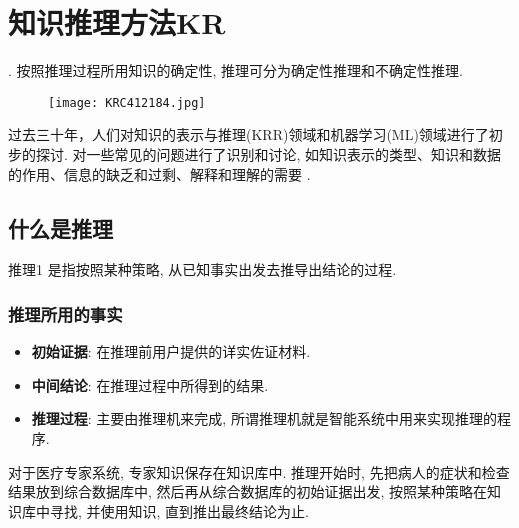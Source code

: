 \chapter{知识推理方法KR}\label{AIchap3}
\begin{tcolorbox}[colback=white!50,colframe=orange!50,title=智能系统的推理过程]
. 按照推理过程所用知识的确定性, 推理可分为确定性推理和不确定性推理.
\end{tcolorbox}
\begin{figure}[H]
\centering
\texttt{[image: KRC412184.jpg]}
\label{KRC412184004}
\end{figure}

过去三十年，人们对知识的表示与推理(KRR)领域和机器学习(ML)领域进行了初步的探讨. 对一些常见的问题进行了识别和讨论, 如知识表示的类型、知识和数据的作用、信息的缺乏和过剩、解释和理解的需要 \cite{BouraouiKR2019}.
\section{什么是推理}
\begin{mydef}{推理}{1}
是指按照某种策略, 从已知事实出发去推导出结论的过程.
\end{mydef}
\subsection{推理所用的事实}
\begin{itemize}
\item \textbf{初始证据}: 在推理前用户提供的详实佐证材料.
\item \textbf{中间结论}: 在推理过程中所得到的结果.
\item \textbf{推理过程}: 主要由推理机来完成, 所谓推理机就是智能系统中用来实现推理的程序.
\end{itemize}
\begin{example}
  对于医疗专家系统, 专家知识保存在知识库中. 推理开始时, 先把病人的症状和检查结果放到综合数据库中, 然后再从综合数据库的初始证据出发, 按照某种策略在知识库中寻找, 并使用知识, 直到推出最终结论为止.
\end{example}

